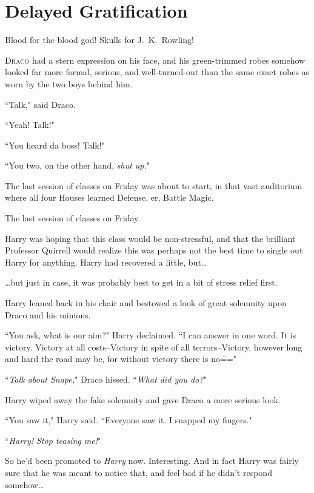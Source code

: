 \chapter{Delayed Gratification}

\begin{chapterOpeningAuthorNote}
Blood for the blood god! Skulls for J.~K.~Rowling!
\end{chapterOpeningAuthorNote}

\lettrine{D}{raco} had a stern expression on his face, and his green-trimmed robes somehow looked far more formal, serious, and well-turned-out than the same exact robes as worn by the two boys behind him.

``Talk," said Draco.

``Yeah! Talk!"

``You heard da boss! Talk!"

``You two, on the other hand, \emph{shut up.}"

The last session of classes on Friday was about to start, in that vast auditorium where all four Houses learned Defense, er, Battle Magic.

The last session of classes on Friday.

Harry was hoping that this class would be non-stressful, and that the brilliant Professor Quirrell would realize this was perhaps not the best time to single out Harry for anything. Harry had recovered a little, but{\ldots}

{\ldots}but just in case, it was probably best to get in a bit of stress relief first.

Harry leaned back in his chair and bestowed a look of great solemnity upon Draco and his minions.

``You ask, what is our aim?" Harry declaimed. ``I can answer in one word. It is victory. Victory at all costs\---Victory in spite of all terrors\---Victory, however long and hard the road may be, for without victory there is no\==="

``\emph{Talk about Snape,}" Draco hissed. ``\emph{What did you do?}"

Harry wiped away the fake solemnity and gave Draco a more serious look.

``You saw it," Harry said. ``Everyone saw it. I snapped my fingers."

``\emph{Harry! Stop teasing me!}"

So he'd been promoted to \emph{Harry} now. Interesting. And in fact Harry was fairly sure that he was meant to notice that, and feel bad if he didn't respond somehow{\ldots}

